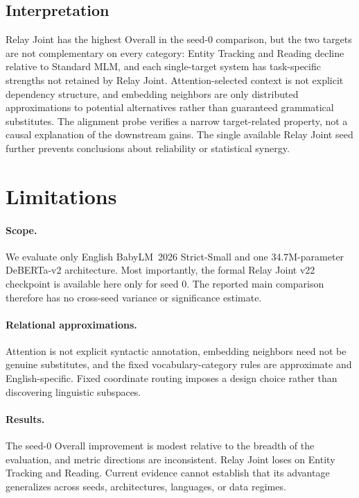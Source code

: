 \documentclass[11pt,a4paper]{article}
\begin{document}
\subsection{Interpretation}
\label{sec:discussion}

Relay Joint has the highest Overall in the seed-0 comparison, but the
two targets are not complementary on every category: Entity Tracking
and Reading decline relative to Standard MLM, and each single-target
system has task-specific strengths not retained by Relay Joint.
Attention-selected context is not explicit dependency structure, and
embedding neighbors are only distributed approximations to potential
alternatives rather than guaranteed grammatical substitutes. The
alignment probe verifies a narrow target-related property, not a
causal explanation of the downstream gains. The single available
Relay Joint seed further prevents conclusions about reliability or
statistical synergy.

\section{Limitations}

\paragraph{Scope.} We evaluate only English BabyLM~2026 Strict-Small
and one 34.7M-parameter DeBERTa-v2 architecture. Most importantly, the
formal Relay Joint v22 checkpoint is available here only for seed 0.
The reported main comparison therefore has no cross-seed variance or
significance estimate.

\paragraph{Relational approximations.} Attention is not explicit
syntactic annotation, embedding neighbors need not be genuine
substitutes, and the fixed vocabulary-category rules are approximate
and English-specific. Fixed coordinate routing imposes a design choice
rather than discovering linguistic subspaces.

\paragraph{Results.} The seed-0 Overall improvement is modest relative
to the breadth of the evaluation, and metric directions are
inconsistent. Relay Joint loses on Entity Tracking and Reading.
Current evidence cannot establish that its advantage generalizes
across seeds, architectures, languages, or data regimes.
\end{document}
